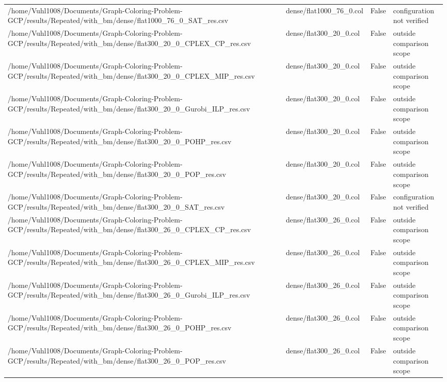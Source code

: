 \begin{table}[htbp]
\begin{tabular}{llll}
/home/Vuhl1008/Documents/Graph-Coloring-Problem-GCP/results/Repeated/with\_bm/dense/flat1000\_76\_0\_SAT\_res.csv & dense/flat1000\_76\_0.col & False & configuration not verified \\
/home/Vuhl1008/Documents/Graph-Coloring-Problem-GCP/results/Repeated/with\_bm/dense/flat300\_20\_0\_CPLEX\_CP\_res.csv & dense/flat300\_20\_0.col & False & outside comparison scope \\
/home/Vuhl1008/Documents/Graph-Coloring-Problem-GCP/results/Repeated/with\_bm/dense/flat300\_20\_0\_CPLEX\_MIP\_res.csv & dense/flat300\_20\_0.col & False & outside comparison scope \\
/home/Vuhl1008/Documents/Graph-Coloring-Problem-GCP/results/Repeated/with\_bm/dense/flat300\_20\_0\_Gurobi\_ILP\_res.csv & dense/flat300\_20\_0.col & False & outside comparison scope \\
/home/Vuhl1008/Documents/Graph-Coloring-Problem-GCP/results/Repeated/with\_bm/dense/flat300\_20\_0\_POHP\_res.csv & dense/flat300\_20\_0.col & False & outside comparison scope \\
/home/Vuhl1008/Documents/Graph-Coloring-Problem-GCP/results/Repeated/with\_bm/dense/flat300\_20\_0\_POP\_res.csv & dense/flat300\_20\_0.col & False & outside comparison scope \\
/home/Vuhl1008/Documents/Graph-Coloring-Problem-GCP/results/Repeated/with\_bm/dense/flat300\_20\_0\_SAT\_res.csv & dense/flat300\_20\_0.col & False & configuration not verified \\
/home/Vuhl1008/Documents/Graph-Coloring-Problem-GCP/results/Repeated/with\_bm/dense/flat300\_26\_0\_CPLEX\_CP\_res.csv & dense/flat300\_26\_0.col & False & outside comparison scope \\
/home/Vuhl1008/Documents/Graph-Coloring-Problem-GCP/results/Repeated/with\_bm/dense/flat300\_26\_0\_CPLEX\_MIP\_res.csv & dense/flat300\_26\_0.col & False & outside comparison scope \\
/home/Vuhl1008/Documents/Graph-Coloring-Problem-GCP/results/Repeated/with\_bm/dense/flat300\_26\_0\_Gurobi\_ILP\_res.csv & dense/flat300\_26\_0.col & False & outside comparison scope \\
/home/Vuhl1008/Documents/Graph-Coloring-Problem-GCP/results/Repeated/with\_bm/dense/flat300\_26\_0\_POHP\_res.csv & dense/flat300\_26\_0.col & False & outside comparison scope \\
/home/Vuhl1008/Documents/Graph-Coloring-Problem-GCP/results/Repeated/with\_bm/dense/flat300\_26\_0\_POP\_res.csv & dense/flat300\_26\_0.col & False & outside comparison scope \\

\end{tabular}
\end{table}
